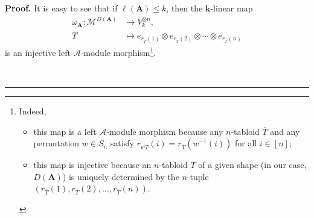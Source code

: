 \documentclass[numbers=enddot,12pt,final,onecolumn,notitlepage]{scrartcl}%
\numberwithin{exer}{subsection}
\theoremstyle{definition}
\newenvironment{proof}[1][Proof]{\noindent\textbf{#1.} }{\ \rule{0.5em}{0.5em}}
\begin{document}
\begin{proof}
It is easy to see that if $\ell\left(  \mathbf{A}\right)  \leq k$, then the
$\mathbf{k}$-linear map%
\begin{align*}
\omega_{\mathbf{A}}:\mathcal{M}^{D\left(  \mathbf{A}\right)  }  &  \rightarrow
V_{k}^{\otimes n},\\
\overline{T}  &  \mapsto e_{r_{\overline{T}}\left(  1\right)  }\otimes
e_{r_{\overline{T}}\left(  2\right)  }\otimes\cdots\otimes e_{r_{\overline{T}%
}\left(  n\right)  }%
\end{align*}
is an injective left $\mathcal{A}$-module morphism\footnote{Indeed,
\par
\begin{itemize}
\item this map is a left $\mathcal{A}$-module morphism because any $n$-tabloid
$\overline{T}$ and any permutation $w\in S_{n}$ satisfy $r_{\overline{wT}%
}\left(  i\right)  =r_{\overline{T}}\left(  w^{-1}\left(  i\right)  \right)  $
for all $i\in\left[  n\right]  $;
\par
\item this map is injective because an $n$-tabloid $\overline{T}$ of a given
shape (in our case, $D\left(  \mathbf{A}\right)  $) is uniquely determined by
the $n$-tuple $\left(  r_{\overline{T}}\left(  1\right)  ,r_{\overline{T}%
}\left(  2\right)  ,\ldots,r_{\overline{T}}\left(  n\right)  \right)  $.
\end{itemize}
}.


\end{proof}
\end{document}
